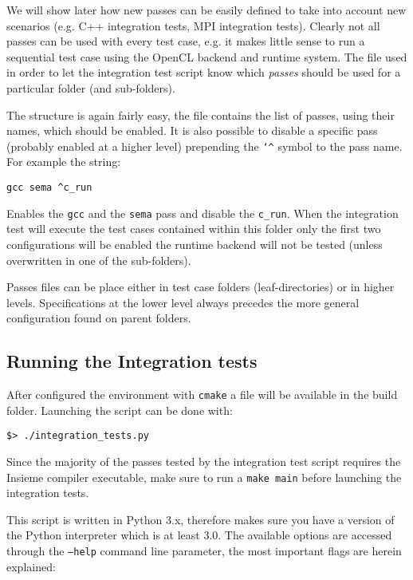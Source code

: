 We will show later how new passes can be easily defined to take into account new
scenarios (e.g. C++ integration tests, MPI integration tests). Clearly not all
passes can be used with every test case, e.g. it makes little sense to run a
sequential test case using the OpenCL backend and runtime system. The
 file used in order to let the integration test script know which
{\em passes} should be used for a particular folder (and sub-folders).

The structure is again fairly easy, the file contains the list of passes, using their
names, which should be enabled. It is also possible to disable a specific pass
(probably enabled at a higher level) prepending the {\tt \char`\^} symbol to the pass
name. For example the string:
\begin{verbatim} 
gcc sema ^c_run
\end{verbatim} 
Enables the {\tt gcc} and the {\tt sema} pass and disable the {\tt c\_run}. When
the integration test will execute the test cases contained within this folder
only the first two configurations will be enabled the runtime backend will not
be tested (unless overwritten in one of the sub-folders).

Passes files can be place either in test case folders (leaf-directories) or in
higher levels. Specifications at the lower level always precedes the more
general configuration found on parent folders.  

\subsection{Running the Integration tests} 

After configured the environment with {\tt cmake} a 
file will be available in the build folder. Launching the script can be done
with:

\begin{verbatim}
$> ./integration_tests.py 
\end{verbatim}

Since the majority of the passes tested by the integration test script requires
the Insieme compiler executable, make sure to run a {\tt make main} before
launching the integration tests.

This script is written in Python 3.x, therefore makes sure you have a version of
the Python interpreter which is at least 3.0.  The available options are
accessed through the {\tt --help} command line parameter, the most important
flags are herein explained:

